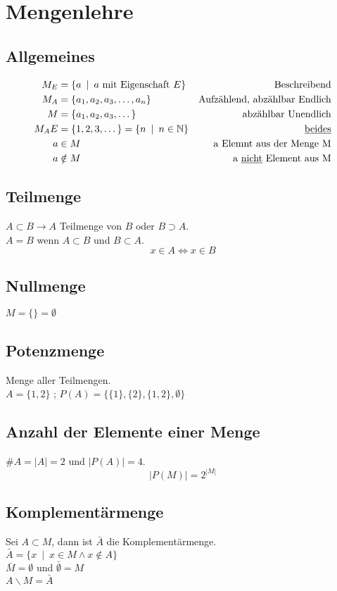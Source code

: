 \section{Mengenlehre}

\subsection{Allgemeines}
\begin{align*}
M_E &= \{ a \enspace|\enspace a \text{ mit Eigenschaft } E\} &\text{Beschreibend}\\
M_A &= \{a_1 , a_2 , a_3 , \dots , a_n\} &\text{Aufzählend, abzählbar Endlich}\\
M &= \{a_1 , a_2 , a_3 , \dots \} &\text{abzählbar Unendlich}\\
M_AE &= \{ 1,2,3,\dots \} = \{n \enspace|\enspace n \in \mathbb{N} \} &\text{\underline{beides}}\\
a &\in M &\text{a Elemnt aus der Menge M}\\
a &\notin M &\text{a \underline{nicht} Element aus M}
\end{align*}

\subsection{Teilmenge} 
$A \subset B \to A$ Teilmenge von $B$ oder $B \supset A$. \\
$A = B$ wenn $A \subset B$ und $B \subset A$.
$$ x \in A \Leftrightarrow  x \in B $$

\subsection{Nullmenge} 
$M = \{ \} = \emptyset $

\subsection{Potenzmenge} 
Menge aller Teilmengen. \\
$A = \{1,2\}$ ; $P(A) = \{ \{1\},\{2\},\{1,2\},\emptyset \}$

\subsection{Anzahl der Elemente einer Menge} 
$\#A = |A| = 2$ und $|P(A)| = 4$.
$$|P(M)| = 2^{|M|}$$  

\subsection{Komplementärmenge}
Sei $A \subset M$, dann ist $\bar{A}$ die Komplementärmenge.\\
$\bar{A} = \{ x \enspace | \enspace x \in M \wedge x \notin A \}$\\
$\bar{M} = \emptyset$ und $\bar{\emptyset} = M$\\
$A \backslash M = \bar{A}$

